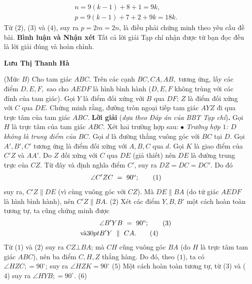 \begin{multicols}{2}
{	\begin{align*}
		n = 9(k - 1) + 8 + 1 = 9k, \tag{$3$}\\
		p = 9(k - 1) + 7 + 2 + 9k = 18k. \tag{$4$}
	\end{align*}
	Từ ($2$), ($3$) và ($4$), suy ra $p = 2m = 2n$, là điều phải chứng minh theo yêu cầu đề bài.
	\vskip 0.05cm
	\textbf{Bình luận và Nhận xét}
	\vskip 0.05cm
	Tất cả lời giải Tạp chí nhận được từ bạn đọc đều là lời giải đúng và hoàn chỉnh.
	\begin{flushright}
		\textbf{Lưu Thị Thanh Hà}
	\end{flushright}
	{}
	(Mức $B$) Cho tam giác $ABC$. Trên các cạnh $BC, CA, AB,$ tương ứng, lấy các điểm $D, E, F,$ sao cho $AEDF$ là hình bình hành ($D, E, F$ không trùng với các đỉnh của tam giác). Gọi $Y$ là điểm đối xứng với $B$ qua $DF$; $Z$ là điểm đối xứng với $C$ qua $DE$. Chứng minh rằng, đường tròn ngoại tiếp tam giác $AYZ$ đi qua trực tâm của tam giác $ABC$.
	\vskip 0.05cm
	\textbf{Lời giải} (\textit{dựa theo Đáp án của BBT Tạp chí})\textbf{.}
	\vskip 0.05cm
	Gọi $H$ là trực tâm của tam giác $ABC$.
	\vskip 0.05cm
	Xét hai trường hợp sau:
	\vskip 0.05cm
	$\bullet$ \textit{Trường hợp $1$: $D$ không là trung điểm của $BC$.}
	\vskip 0.05cm
	Gọi $d$ là đường thẳng vuông góc với $BC$ tại $D$. Gọi $A',B', C'$  tương ứng là điểm đối xứng với $A, B, C$ qua $d$. Gọi $K$ là giao điểm của  $C'Z$ và $AA'$.
	\vskip 0.05cm  
	Do $Z$ đối xứng với $C$ qua $DE$ (giả thiết) nên $DE$ là đường trung trực của $CZ$. Từ đây và định nghĩa điểm $C'$, suy ra $DZ = DC = DC'$.  Do đó
	\begin{align*}
		\angle C'ZC\,\, = \,\,{90^{\rm{o}}}; \tag{$1$}
	\end{align*}
	suy ra, $C'Z \parallel DE$ (vì cùng vuông góc với $CZ$). Mà $DE \parallel BA$  (do tứ giác $AEDF$ là hình bình hành), nên $C'Z \parallel BA$. \hfill ($2$)
	\vskip 0.05cm
	Xét các điểm $Y, B, B'$  một cách hoàn toàn tương tự, ta cũng chứng minh được
	\begin{align*}
		&\angle B'YB\,\, = \,\,{90^{\rm{o}}}; \tag{$3$}\\
	\text{và} \hfill 30pt	&B'Y\,\,\parallel \,\,CA. \tag{$4$}
	\end{align*}
	Từ ($1$) và ($2$) suy ra $CZ \bot BA$; mà $CH$ cũng vuông góc $BA$ (do $H$ là trực tâm tam giác $ABC$), nên ba điểm $C, H, Z$ thẳng hàng. Do đó, theo ($1$), ta có  $\angle HZC; = 90^\circ$; suy ra $\angle HZK = 90^\circ$ \hfill   ($5$)
	\vskip 0.05cm
	Một cách hoàn toàn tương tự, từ ($3$) và ($4$) suy ra  $\angle HYB; = 90^\circ$. \hfill  ($6$)
}
\end{multicols}
